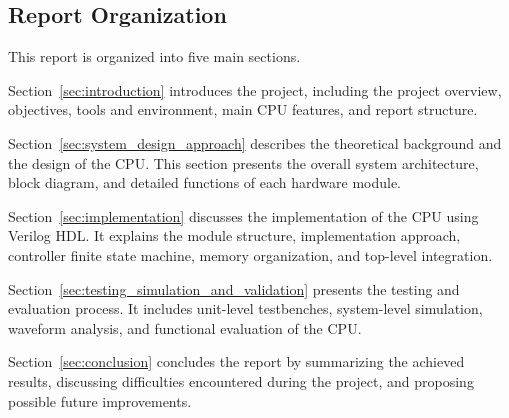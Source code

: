 \subsection{Report Organization}

This report is organized into five main sections.

Section~\ref{sec:introduction} introduces the project, including the project overview, objectives, tools and environment, main CPU features, and report structure.

Section~\ref{sec:system_design_approach} describes the theoretical background and the design of the CPU. This section presents the overall system architecture, block diagram, and detailed functions of each hardware module.

Section~\ref{sec:implementation} discusses the implementation of the CPU using Verilog HDL. It explains the module structure, implementation approach, controller finite state machine, memory organization, and top-level integration.

Section~\ref{sec:testing_simulation_and_validation} presents the testing and evaluation process. It includes unit-level testbenches, system-level simulation, waveform analysis, and functional evaluation of the CPU.

Section~\ref{sec:conclusion} concludes the report by summarizing the achieved results, discussing difficulties encountered during the project, and proposing possible future improvements.

